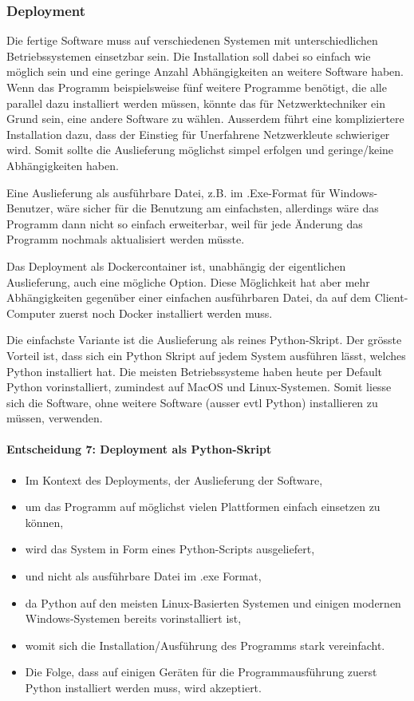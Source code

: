 \documentclass[
	ngerman,
	toc=listof, %
	toc=bibliography, %
	footnotes=multiple, %
	parskip=half, %
	numbers=noendperiod %
]{scrartcl}
\begin{document}
		\subsubsection{Deployment}
		Die fertige Software muss auf verschiedenen Systemen mit unterschiedlichen Betriebssystemen einsetzbar sein.
		Die Installation soll dabei so einfach wie möglich sein und eine geringe Anzahl Abhängigkeiten an weitere Software haben.
		Wenn das Programm beispielsweise fünf weitere Programme benötigt, die alle parallel dazu installiert werden müssen, könnte das für Netzwerktechniker ein Grund sein, eine andere Software zu wählen.
		Ausserdem führt eine kompliziertere Installation dazu, dass der Einstieg für Unerfahrene Netzwerkleute schwieriger wird.
		Somit sollte die Auslieferung möglichst simpel erfolgen und geringe/keine Abhängigkeiten haben.
		
		Eine Auslieferung als ausführbare Datei, z.B. im .Exe-Format für Windows-Benutzer, wäre sicher für die Benutzung am einfachsten,
		allerdings wäre das Programm dann nicht so einfach erweiterbar, weil für jede Änderung das Programm nochmals aktualisiert werden müsste.

		Das Deployment als Dockercontainer ist, unabhängig der eigentlichen Auslieferung, auch eine mögliche Option.
		Diese Möglichkeit hat aber mehr Abhängigkeiten gegenüber einer einfachen ausführbaren Datei, da auf dem Client-Computer zuerst noch Docker installiert werden muss.
		
		Die einfachste Variante ist die Auslieferung als reines Python-Skript. Der grösste Vorteil ist, dass sich ein Python Skript auf jedem System ausführen lässt, welches Python installiert hat.
		Die meisten Betriebssysteme haben heute per Default Python vorinstalliert, zumindest auf MacOS und Linux-Systemen.
		Somit liesse sich die Software, ohne weitere Software (ausser evtl Python) installieren zu müssen, verwenden.

		\paragraph{Entscheidung 7: Deployment als Python-Skript}
		\begin{itemize}
			\item Im Kontext des Deployments, der Auslieferung der Software,
			\item um das Programm auf möglichst vielen Plattformen einfach einsetzen zu können,
			\item wird das System in Form eines Python-Scripts ausgeliefert,
			\item und nicht als ausführbare Datei im .exe Format,
			\item da Python auf den meisten Linux-Basierten Systemen und einigen modernen Windows-Systemen bereits vorinstalliert ist,
			\item womit sich die Installation/Ausführung des Programms stark vereinfacht.
			\item Die Folge, dass auf einigen Geräten für die Programmausführung zuerst Python installiert werden muss, wird akzeptiert.
		\end{itemize}
\end{document}
